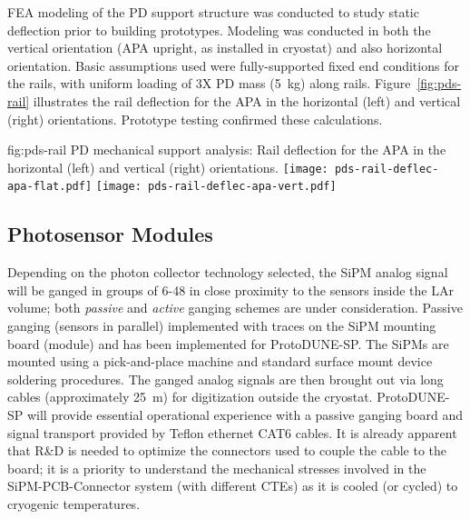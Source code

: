 FEA modeling of the PD support structure was conducted to study static deflection 
prior to building prototypes.  Modeling was conducted in both the vertical
 orientation (APA upright, as installed in cryostat) and also horizontal orientation.  
Basic assumptions used were fully-supported fixed end conditions for the rails, 
with uniform loading of 3X PD mass (\SI{5}{kg}) along rails.  
Figure~\ref{fig:pds-rail} illustrates the rail deflection for the APA in the horizontal (left) and vertical (right) orientations.
Prototype testing confirmed these calculations.

\begin{dunefigure}{fig:pds-rail}
{PD mechanical support analysis: Rail deflection for the APA in the horizontal (left) and vertical (right) orientations.}
	\texttt{[image: pds-rail-deflec-apa-flat.pdf]} 
	\texttt{[image: pds-rail-deflec-apa-vert.pdf]}\\
\end{dunefigure}


\subsection{Photosensor Modules}
\label{sec:fdsp-pd-assy-psm}

Depending on the photon collector  technology selected, the SiPM analog signal will be ganged in groups of 6-48 in close proximity to the sensors inside the
LAr volume; both {\it passive} and {\it active} ganging schemes are under consideration.  Passive ganging (sensors in parallel) implemented with traces on the SiPM mounting board (module) and has been implemented for ProtoDUNE-SP.  The SiPMs are mounted using a pick-and-place machine and standard surface mount device soldering procedures. 
 The ganged analog signals are then brought out via long cables (approximately \SI{25}{m}) for digitization outside the cryostat.
 ProtoDUNE-SP will provide essential operational experience with a passive ganging board and signal transport provided by Teflon ethernet CAT6 cables.
It is already apparent that R\&D is needed to optimize the connectors used to couple the cable to the board;  it is a priority to understand the 
mechanical stresses involved in the SiPM-PCB-Connector system (with different CTEs) as it is cooled (or cycled) to cryogenic temperatures.
 
